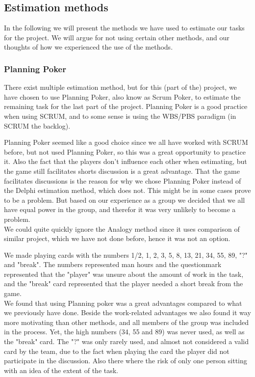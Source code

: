 \subsection{Estimation methods}
In the following we will present the methods we have used to estimate our tasks for the project. We will argue for not using certain other methods, and our thoughts of how we experienced the use of the methods.
\subsubsection{Planning Poker}
There exist multiple estimation method, but for this (part of the) project, we have chosen to use Planning Poker, also know as Scrum Poker, to estimate the remaining task for the last part of the project. Planning Poker is a good practice when using SCRUM, and to some sense is using the WBS/PBS paradigm (in SCRUM the backlog).

Planning Poker seemed like a good choice since we all have worked with SCRUM before, but not used Planning Poker, so this was a great opportunity to practice it. Also the fact that the players don't influence each other when estimating, but the game still facilitates shorts discussion is a great advantage. That the game facilitates discussions is the reason for why we chose Planning Poker instead of the Delphi estimation method, which does not. This might be in some cases prove to be a problem. But based on our experience as a group we decided that we all have equal power in the group, and therefor it was very unlikely to become a problem. \\
We could quite quickly ignore the Analogy method since it uses comparison of similar project, which we have not done before, hence it was not an option.

We made playing cards with the numbers 1/2, 1, 2, 3, 5, 8, 13, 21, 34, 55, 89, "?" and "break". The numbers represented man hours and the questionmark represented that the "player" was unsure about the amount of work in the task, and the "break" card represented that the player needed a short break from the game.\\
We found that using Planning poker was a great advantages compared to what we previously have done. Beside the work-related advantages we also found it way more motivating than other methods, and all members of the group was included in the process. Yet, the high numbers (34, 55 and 89) was never used, as well as the "break" card. The "?" was only rarely used, and almost not considered a valid card by the team, due to the fact when playing the card the player did not participate in the discussion. Also there where the risk of only one person sitting with an idea of the extent of the task.

